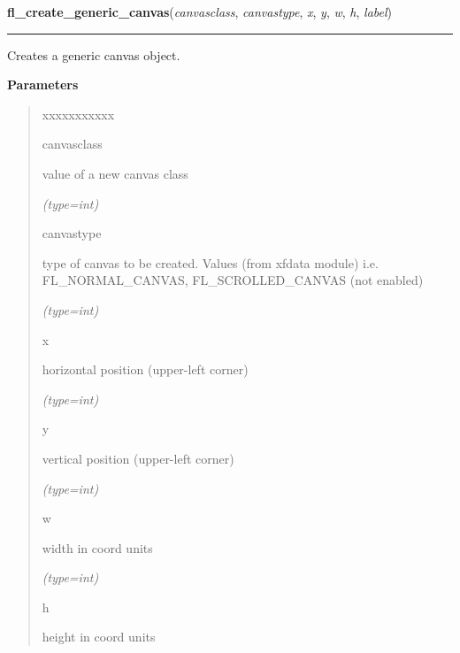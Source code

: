     \vspace{0.5ex}

\hspace{.8\funcindent}\begin{boxedminipage}{\funcwidth}

    \raggedright \textbf{fl\_create\_generic\_canvas}(\textit{canvasclass}, \textit{canvastype}, \textit{x}, \textit{y}, \textit{w}, \textit{h}, \textit{label})

    \vspace{-1.5ex}

    \rule{\textwidth}{0.5\fboxrule}
\setlength{\parskip}{2ex}
    Creates a generic canvas object.

\setlength{\parskip}{1ex}
      \textbf{Parameters}
      \vspace{-1ex}

      \begin{quote}
        \begin{Ventry}{xxxxxxxxxxx}

          \item[canvasclass]

          value of a new canvas class

            {\it (type=int)}

          \item[canvastype]

          type of canvas to be created. Values (from xfdata module) i.e. 
          FL\_NORMAL\_CANVAS, FL\_SCROLLED\_CANVAS (not enabled)

            {\it (type=int)}

          \item[x]

          horizontal position (upper-left corner)

            {\it (type=int)}

          \item[y]

          vertical position (upper-left corner)

            {\it (type=int)}

          \item[w]

          width in coord units

            {\it (type=int)}

          \item[h]

          height in coord units


\end{Ventry}
\end{quote}
\end{boxedminipage}
